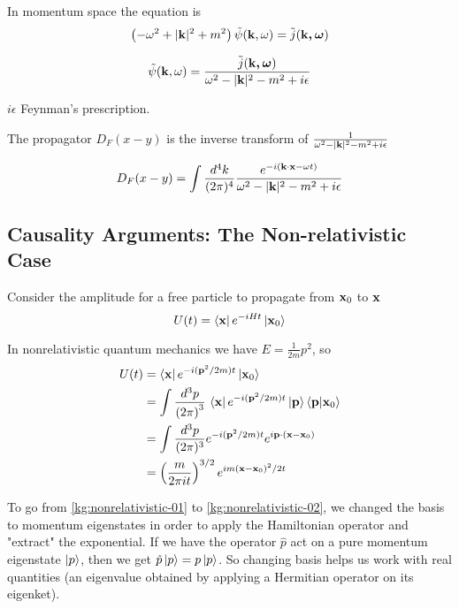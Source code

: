 In momentum space the equation is
$$
\left( -\omega^2 + |\boldsymbol{\mathbf{k}}|^2 + m^2 \right) \tilde{\psi}(\boldsymbol{\mathbf{k}}, \omega) = \tilde{j}(\boldsymbol{\mathbf{\boldsymbol{\mathbf{k}}, \omega}})
$$

$$
\tilde{\psi}(\boldsymbol{\mathbf{k}}, \omega) = \frac{ \tilde{j}(\boldsymbol{\mathbf{\boldsymbol{\mathbf{k}}, \omega}}) }{ \omega^2 - |\boldsymbol{\mathbf{k}}|^2 - m^2 + i\epsilon }
$$

$i\epsilon$ Feynman's prescription.

The propagator $D_F(x-y)$ is the inverse transform of
$\frac{ 1 }{ \omega^2 - |\boldsymbol{\mathbf{k}}|^2 - m^2 + i\epsilon }$

$$
D_F(x-y) = \int \frac{d^4k}{(2\pi)^4}
    \frac{ e^{-i(\boldsymbol{\mathbf{k}}\cdot\boldsymbol{\mathbf{x}} -\omega t)} }{ \omega^2 - |\boldsymbol{\mathbf{k}}|^2 - m^2 + i\epsilon }
$$






\subsection{Causality Arguments: The Non-relativistic Case}

Consider the amplitude for a free particle to propagate from $\boldsymbol{\mathbf{x}}_0$ to $\boldsymbol{\mathbf{x}}$
$$
U(t) = \bra{\boldsymbol{\mathbf{x}}} e^{-iHt} \ket{\boldsymbol{\mathbf{x}}_0}
$$

In nonrelativistic quantum mechanics we have $E = \frac{1}{2m} p^2$, so
\begin{align}
U(t) &= \bra{\boldsymbol{\mathbf{x}}} e^{-i(\boldsymbol{\mathbf{p}}^2/2m)t} \ket{\boldsymbol{\mathbf{x}}_0} \label{kg:nonrelativistic-01} \\
&= \int \frac{d^3p}{\left(2\pi\right)^3} \, \bra{\boldsymbol{\mathbf{x}}} e^{-i(\boldsymbol{\mathbf{p}}^2/2m)t} \ket{\boldsymbol{\mathbf{p}}} \braket{\boldsymbol{\mathbf{p}} | \boldsymbol{\mathbf{x}}_0} \label{kg:nonrelativistic-02} \\
&= \int \frac{d^3p}{(2\pi)^3} e^{-i(\boldsymbol{\mathbf{p}}^2/2m)t} e^{i\boldsymbol{\mathbf{p}}\cdot(\boldsymbol{\mathbf{x}}-\boldsymbol{\mathbf{x}}_0)} \label{kg:nonrelativistic-03} \\
&= \left( \frac{m}{2\pi i t} \right)^{3/2} e^{im (\boldsymbol{\mathbf{x}}-\boldsymbol{\mathbf{x}}_0)^2 /2t} \label{kg:nonrelativistic-04}
\end{align}


To go from \ref{kg:nonrelativistic-01} to \ref{kg:nonrelativistic-02},
we changed the basis to momentum eigenstates in order to apply the Hamiltonian operator and "extract" the exponential.
If we have the operator $\hat{p}$ act on a pure momentum eigenstate $\ket{p}$, then we get $\hat{p}\ket{p} = p\ket{p}$.
So changing basis helps us work with real quantities
(an eigenvalue obtained by applying a Hermitian operator on its eigenket).

